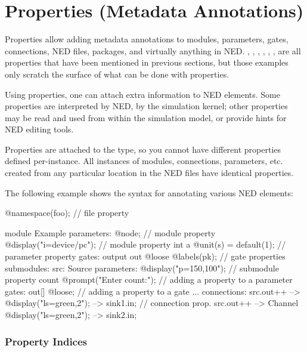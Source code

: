 \section{Properties (Metadata Annotations)}
\label{sec:ch-ned-lang:properties}

Properties allow adding metadata annotations to modules, parameters, gates,
connections, NED files, packages, and virtually anything in NED.
, , , , ,
,  are all properties that have been mentioned in
previous sections, but those examples only scratch the surface of what can
be done with properties.


Using properties, one can attach extra information to NED elements. Some
properties are interpreted by NED, by the simulation kernel; other
properties may be read and used from within the simulation model, or
provide hints for NED editing tools.

Properties are attached to the type, so you cannot have different properties defined
per-instance. All instances of modules, connections,
parameters, etc. created from any particular location in the NED files have
identical properties.

The following example shows the syntax for annotating various NED elements:

\begin{ned}
@namespace(foo);  // file property

module Example
{
    parameters:
       @node;   // module property
       @display("i=device/pc");   // module property
       int a @unit(s) = default(1); // parameter property
    gates:
       output out @loose @labels(pk);  // gate properties
    submodules:
       src: Source {
           parameters:
              @display("p=150,100");  // submodule property
              count @prompt("Enter count:"); // adding a property to a parameter
           gates:
              out[] @loose;  // adding a property to a gate
       }
       ...
    connections:
       src.out++ --> { @display("ls=green,2"); } --> sink1.in; // connection prop.
       src.out++ --> Channel { @display("ls=green,2"); } --> sink2.in;
}
\end{ned}


\subsubsection{Property Indices}

